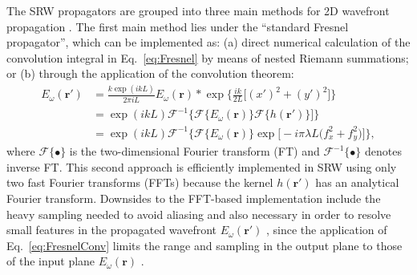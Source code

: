\documentclass{iucr}              %
\begin{document}
 The SRW propagators are grouped into three main methods for 2D wavefront propagation \cite{SRWgit}. The first main method lies under the ``standard Fresnel propagator'', which can be implemented as: (a) direct numerical calculation of the convolution integral in Eq.~\ref{eq:Fresnel} by means of nested Riemann summations; or (b) through the application of the convolution theorem:
 \begin{equation}\label{eq:FresnelConv}
\begin{split}
    E_\omega(\textbf{r}')&=\frac{k\exp{(ikL)}}{2\pi i L} E_\omega(\textbf{r}) * \exp{\bigg\{ \frac{ik}{2L}\big[ (x')^2 + (y')^2 \big]\bigg\}}\\
   &= \exp{(ikL)}\mathcal{F}^{-1}\big\{\mathcal{F}\{E_\omega(\textbf{r})\}\mathcal{F}\{h(\textbf{r}')\}\big]\}\\
   &=\exp{(ikL)}\mathcal{F}^{-1}\big\{\mathcal{F}\{E_\omega(\textbf{r})\}\exp\big[-i\pi\lambda L\big(f_x^2+f_y^2\big)\big]\},
\end{split}
\end{equation}
where $\mathcal{F}\{\bullet\}$ is the two-dimensional Fourier transform (FT) and $\mathcal{F}^{-1}\{\bullet\}$ denotes inverse FT. This second approach is efficiently implemented in SRW using only two fast Fourier transforms (FFTs) because the kernel $h(\textbf{r}')$ has an analytical Fourier transform. Downsides to the FFT-based implementation include the heavy sampling needed to avoid aliasing and also necessary in order to resolve small features in the propagated wavefront $ E_\omega(\textbf{r}')$ , since the application of Eq.~\ref{eq:FresnelConv} limits the range and sampling in the output plane to those of the input plane $ E_\omega(\textbf{r})$ \cite{Kelly2014}.
\end{document}
